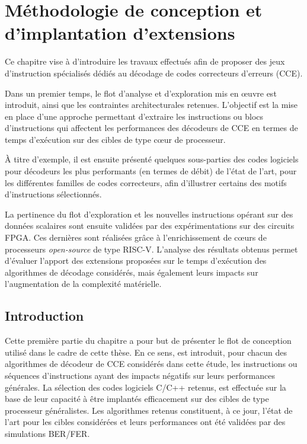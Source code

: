\documentclass[../main.tex]{subfiles}
\begin{document}
%
%
%
\chapter{Méthodologie de conception et d'implantation d'extensions} 
\label{chapter:3}
%
% 
%
%
%

Ce chapitre vise à d'introduire les travaux effectués afin de proposer des jeux d'instruction spécialisés dédiés au décodage de codes correcteurs d'erreurs (CCE). 

Dans un premier temps, le flot d'analyse et d'exploration mis en œuvre est introduit, ainsi que les contraintes architecturales retenues. L'objectif est la mise en place d'une approche permettant d'extraire les instructions ou blocs d'instructions qui affectent les performances des décodeurs de CCE en termes de temps d'exécution sur des cibles de type cœur de processeur. 

À titre d'exemple, il est ensuite présenté quelques sous-parties des codes logiciels pour décodeurs les plus performants (en termes de débit) de l'état de l'art, pour les différentes familles de codes correcteurs, afin d'illustrer certains des motifs d'instructions sélectionnés. 

La pertinence du flot d'exploration et les nouvelles instructions opérant sur des données scalaires sont ensuite validées par des expérimentations sur des circuits FPGA. Ces dernières sont réalisées grâce à l'enrichissement de cœurs de processeurs \textit{open-source} de type RISC-V. 
L'analyse des résultats obtenus permet d'évaluer l'apport des extensions proposées sur le temps d'exécution des algorithmes de décodage considérés, mais également leurs impacts sur l'augmentation de la complexité matérielle. 



\etocsettocstyle{{\large \hspace{-1.5 em} \textbf{} \hfill}\vspace{-2.5 em}\\\par\noindent\rule{\linewidth}{1 pt}\vspace{-.2 em}}{\par\noindent\rule{\linewidth}{1 pt}\\}
\localtableofcontents
%
%
%
%
%
\section{Introduction}
%
%
%
%
%
%
Cette première partie du chapitre a pour but de présenter le flot de conception utilisé dans le cadre de cette thèse. 
En ce sens, est introduit, pour chacun des algorithmes de décodeur de CCE considérés dans cette étude, les instructions ou séquences d'instructions ayant des impacts négatifs sur leurs performances générales. 
La sélection des codes logiciels C/C++ retenus, est effectuée sur la base de leur capacité à être implantés efficacement sur des cibles de type processeur généralistes. 
Les algorithmes retenus constituent, à ce jour, l'état de l'art pour les cibles considérées et leurs performances ont été validées par des simulations BER/FER. 
\end{document}
